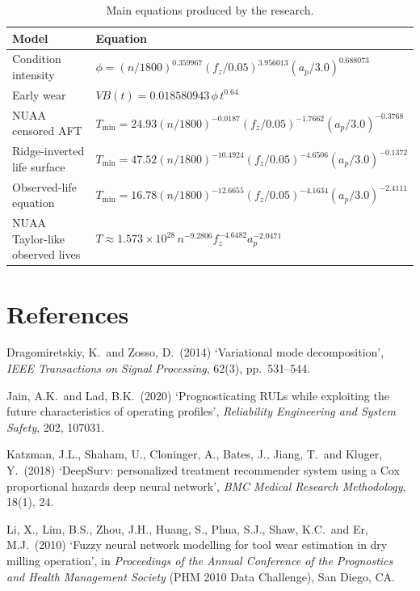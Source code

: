 \documentclass[11pt,a4paper]{article}
\newcommand{\vb}{V\!B}
\newcommand{\phii}{\phi}
\begin{document}
\begin{table}[!htbp]
  \centering
  \caption{Main equations produced by the research.}
  \label{tab:equation-summary}
  \small
  \begin{tabularx}{\textwidth}{p{3.1cm}Y}
    \toprule
    Model & Equation \\
    \midrule
    Condition intensity &
    \(\phii=(n/1800)^{0.359967}(f_z/0.05)^{3.956013}(a_p/3.0)^{0.688073}\) \\
    Early wear &
    \(\vb(t)=0.018580943\,\phii\,t^{0.64}\) \\
    NUAA censored AFT &
    \(T_{\min}=24.93(n/1800)^{-0.0187}(f_z/0.05)^{-1.7662}(a_p/3.0)^{-0.3768}\) \\
    Ridge-inverted life surface &
    \(T_{\min}=47.52(n/1800)^{-10.4924}(f_z/0.05)^{-4.6506}(a_p/3.0)^{-0.1372}\) \\
    Observed-life equation &
    \(T_{\min}=16.78(n/1800)^{-12.6655}(f_z/0.05)^{-4.1634}(a_p/3.0)^{-2.4111}\) \\
    NUAA Taylor-like observed lives &
    \(T\approx1.573{\times}10^{28}\,n^{-9.2806} f_z^{-4.6482} a_p^{-2.0471}\) \\
    \bottomrule
  \end{tabularx}
\end{table}

\renewcommand{\refname}{References}
\section*{References}

\begingroup
\setlength{\parindent}{0pt}
\setlength{\parskip}{0.4em}

Dragomiretskiy, K.\ and Zosso, D.\ (2014) `Variational mode decomposition', \emph{IEEE Transactions on Signal Processing}, 62(3), pp.~531--544.

Jain, A.K.\ and Lad, B.K.\ (2020) `Prognosticating RULs while exploiting the future characteristics of operating profiles', \emph{Reliability Engineering and System Safety}, 202, 107031.

Katzman, J.L., Shaham, U., Cloninger, A., Bates, J., Jiang, T.\ and Kluger, Y.\ (2018) `DeepSurv: personalized treatment recommender system using a Cox proportional hazards deep neural network', \emph{BMC Medical Research Methodology}, 18(1), 24.

Li, X., Lim, B.S., Zhou, J.H., Huang, S., Phua, S.J., Shaw, K.C.\ and Er, M.J.\ (2010) `Fuzzy neural network modelling for tool wear estimation in dry milling operation', in \emph{Proceedings of the Annual Conference of the Prognostics and Health Management Society} (PHM 2010 Data Challenge), San Diego, CA.
\end{document}
